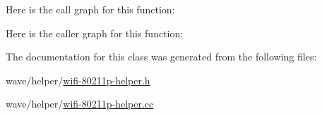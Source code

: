 Here is the call graph for this function\+:




Here is the caller graph for this function\+:




The documentation for this class was generated from the following files\+:\begin{DoxyCompactItemize}
\item 
wave/helper/\hyperlink{wifi-80211p-helper_8h}{wifi-\/80211p-\/helper.\+h}\item 
wave/helper/\hyperlink{wifi-80211p-helper_8cc}{wifi-\/80211p-\/helper.\+cc}\end{DoxyCompactItemize}
